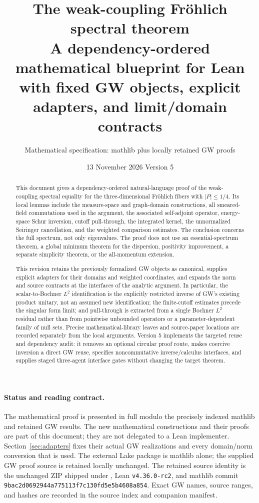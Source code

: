 \documentclass[11pt,a4paper]{article}
\title{The weak-coupling Fr\"ohlich spectral theorem\\\large A dependency-ordered mathematical blueprint for Lean\\\normalsize with fixed GW objects, explicit adapters, and limit/domain contracts}
\author{Mathematical specification: mathlib plus locally retained GW proofs}
\date{13 November 2026 \quad Version 5}
\theoremstyle{remark}\newtheorem{remark}[theorem]{Remark}
\begin{document}
\maketitle
\begin{abstract}
This document gives a dependency-ordered natural-language proof of the weak-coupling spectral equality for the three-dimensional Fr\"ohlich fibers with $|P|\leq1/4$. Its local lemmas include the measure-space and graph-domain constructions, all smeared-field commutations used in the argument, the associated self-adjoint operator, energy-space Schur inversion, cutoff pull-through, the integrated kernel, the unnormalized Seiringer cancellation, and the weighted comparison estimates. The conclusion concerns the full spectrum, not only eigenvalues. The proof does not use an essential-spectrum theorem, a global minimum theorem for the dispersion, positivity improvement, a separate simplicity theorem, or the all-momentum extension.

This revision retains the previously formalized GW objects as canonical, supplies explicit adapters for their domains and weighted coordinates, and expands the norm and source contracts at the interfaces of the analytic argument. In particular, the scalar-to-Bochner $L^2$ identification is the explicitly restricted inverse of GW's existing product unitary, not an assumed new identification; the finite-cutoff estimates precede the singular form limit; and pull-through is extracted from a single Bochner $L^2$ residual rather than from pointwise unbounded operators or a parameter-dependent family of null sets. Precise mathematical-library leaves and source-paper locations are recorded separately from the local arguments. Version 5 implements the targeted reuse and dependency audit: it removes an optional circular proof route, makes coercive inversion a direct GW reuse, specifies noncommutative inverse/calculus interfaces, and supplies staged three-agent interface gates without changing the target theorem.
\end{abstract}
\paragraph{Status and reading contract.}
The mathematical proof is presented in full modulo the precisely indexed mathlib and retained GW results. The new mathematical constructions and their proofs are part of this document; they are not delegated to a Lean implementer. Section~\ref{sec:adapters} fixes their actual GW realizations and every domain/norm conversion that is used. The external Lake package is mathlib alone; the supplied GW proof source is retained locally unchanged. The retained source identity is the unchanged ZIP shipped under , Lean \texttt{v4.36.0-rc2}, and mathlib commit \texttt{9bac2d0692944a775113f7c130fd5e5b4608a854}. Exact GW names, source ranges, and hashes are recorded in the source index and companion manifest.
\end{document}
